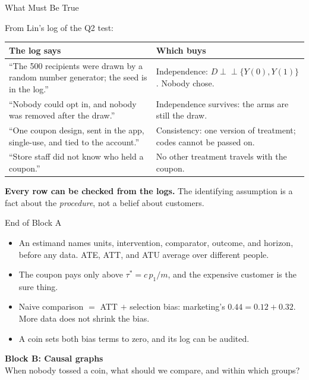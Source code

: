 \documentclass[aspectratio=169, 11pt, handout]{beamer}
\newcommand{\indep}{\perp\!\!\!\perp}
\begin{document}
\begin{frame}{What Must Be True}

From Lin's log of the Q2 test:

\bigskip

\begin{center}
\small
\begin{tabular}{p{6.4cm}p{6.6cm}}
\toprule
\textbf{The log says} & \textbf{Which buys} \\
\midrule
``The 500 recipients were drawn by a random number generator; the seed is in the log.'' & Independence: $D \indep \{Y(0), Y(1)\}$. Nobody chose. \\[0.5em]
``Nobody could opt in, and nobody was removed after the draw.'' & Independence survives: the arms are still the draw. \\[0.5em]
``One coupon design, sent in the app, single-use, and tied to the account.'' & Consistency: one version of treatment; codes cannot be passed on. \\[0.5em]
``Store staff did not know who held a coupon.'' & No other treatment travels with the coupon. \\
\bottomrule
\end{tabular}
\end{center}

\bigskip

\textbf{Every row can be checked from the logs.} The identifying assumption is a fact about the \emph{procedure}, not a belief about customers.
\end{frame}

\begin{frame}{End of Block A}

\begin{itemize}
  \item An estimand names units, intervention, comparator, outcome, and horizon, before any data. ATE, ATT, and ATU average over different people.
  \item The coupon pays only above $\tau^\ast = c\,p_1/m$, and the expensive customer is the sure thing.
  \item Naive comparison $=$ ATT $+$ selection bias: marketing's $0.44 = 0.12 + 0.32$. More data does not shrink the bias.
  \item A coin sets both bias terms to zero, and its log can be audited.
\end{itemize}

\vfill

\begin{center}
\Large \textbf{Block B: Causal graphs}\\[0.4em]
\normalsize When nobody tossed a coin, what should we compare, and within which groups?
\end{center}
\vfill
\end{frame}
\end{document}
